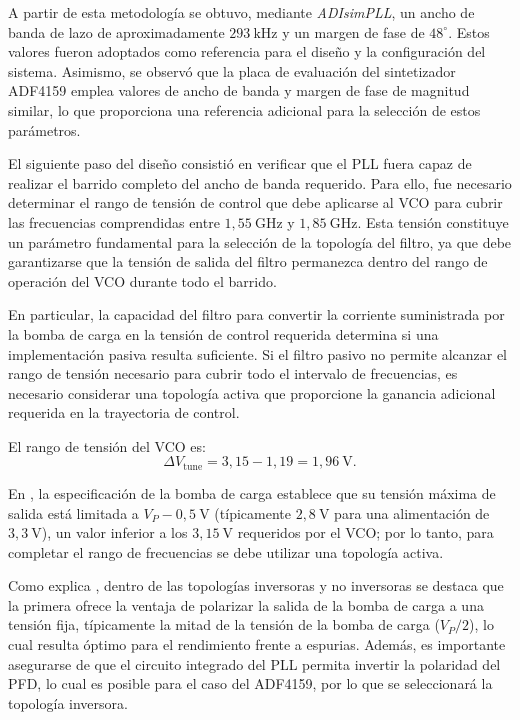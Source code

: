 A partir de esta metodología se obtuvo, mediante \textit{ADIsimPLL}, un ancho de banda de lazo de aproximadamente $293~\mathrm{kHz}$ y un margen de fase de $48^\circ$. Estos valores fueron adoptados como referencia para el diseño y la configuración del sistema. Asimismo, se observó que la placa de evaluación del sintetizador ADF4159 emplea valores de ancho de banda y margen de fase de magnitud similar, lo que proporciona una referencia adicional para la selección de estos parámetros.

El siguiente paso del diseño consistió en verificar que el PLL fuera capaz de realizar el barrido completo del ancho de banda requerido. Para ello, fue necesario determinar el rango de tensión de control que debe aplicarse al VCO para cubrir las frecuencias comprendidas entre $1{,}55~\mathrm{GHz}$ y $1{,}85~\mathrm{GHz}$. Esta tensión constituye un parámetro fundamental para la selección de la topología del filtro, ya que debe garantizarse que la tensión de salida del filtro permanezca dentro del rango de operación del VCO durante todo el barrido.

En particular, la capacidad del filtro para convertir la corriente suministrada por la bomba de carga en la tensión de control requerida determina si una implementación pasiva resulta suficiente. Si el filtro pasivo no permite alcanzar el rango de tensión necesario para cubrir todo el intervalo de frecuencias, es necesario considerar una topología activa que proporcione la ganancia adicional requerida en la trayectoria de control.

El rango de tensión del VCO es:
\begin{equation}
\Delta V_{\text{tune}} = 3{,}15 - 1{,}19 = 1{,}96~\mathrm{V}.
\end{equation}

En \cite{adf4159}, la especificación de la bomba de carga establece que su tensión máxima de salida está limitada a $V_P - 0{,}5~\mathrm{V}$ (típicamente $2{,}8~\mathrm{V}$ para una alimentación de $3{,}3~\mathrm{V}$), un valor inferior a los $3{,}15~\mathrm{V}$ requeridos por el VCO; por lo tanto, para completar el rango de frecuencias se debe utilizar una topología activa.

Como explica \cite{harney_pll}, dentro de las topologías inversoras y no inversoras se destaca que la primera ofrece la ventaja de polarizar la salida de la bomba de carga a una tensión fija, típicamente la mitad de la tensión de la bomba de carga ($V_P/2$), lo cual resulta óptimo para el rendimiento frente a espurias. Además, es importante asegurarse de que el circuito integrado del PLL permita invertir la polaridad del PFD, lo cual es posible para el caso del ADF4159, por lo que se seleccionará la topología inversora.


